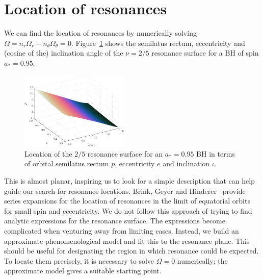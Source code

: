 \documentclass[aps,prd,amsfonts,amssymb,amsmath,nofootinbib,showpacs,superscriptaddress,twocolumn,floatfix]{revtex4-1}
\newcommand{\Figref}[1]{Figure~\ref{fig:#1}}
\begin{document}
\appendix

\section{Location of resonances}\label{sec:location}

We can find the location of resonances by numerically solving $\Omega = n_r \Omega_r - n_\theta \Omega_\theta = 0$. \Figref{res-plane-2-5-95} shows the semilatus rectum, eccentricity and (cosine of the) inclination angle of the $\nu = 2/5$ resonance surface for a BH of spin $a_\ast = 0.95$. 
\begin{figure}
\centering
\includegraphics[width=0.46\textwidth]{Fig_res-2-5-95-plane}
\caption{\label{fig:res-plane-2-5-95}Location of the $2/5$ resonance surface for an $a_\ast = 0.95$ BH in terms of orbital semilatus rectum $p$, eccentricity $e$ and inclination $\iota$.}
\end{figure}
This is almost planar, inspiring us to look for a simple description that can help guide our search for resonance locations. Brink, Geyer and Hinderer~\cite{Brink2013} provide series expansions for the location of resonances in the limit of equatorial orbits for small spin and eccentricity. We do not follow this approach of trying to find analytic expressions for the resonance surface. The expressions become complicated when venturing away from limiting cases. Instead, we build an approximate phenomenological model and fit this to the resonance plane. %
This should be useful for designating the region in which resonance could be expected. To locate them precisely, it is necessary to solve $\Omega = 0$ numerically; the approximate model gives a suitable starting point.
\end{document}
